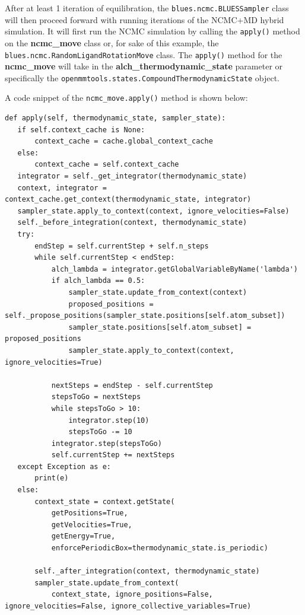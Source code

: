 After at least 1 iteration of equilibration, the \texttt{blues.ncmc.BLUESSampler} class will then proceed forward with running iterations of the NCMC+MD hybrid simulation.
It will first run the NCMC simulation by calling the \texttt{apply()} method on the \textbf{ncmc\_move} class or, for sake of this example, the \texttt{blues.ncmc.RandomLigandRotationMove} class.
The \texttt{apply()} method for the \textbf{ncmc\_move} will take in the \textbf{alch\_thermodynamic\_state} parameter or specifically the \texttt{openmmtools.states.CompoundThermodynamicState} object.

A code snippet of the \texttt{ncmc_move.apply()} method is shown below:

\begin{verbatim}
def apply(self, thermodynamic_state, sampler_state):
   if self.context_cache is None:
       context_cache = cache.global_context_cache
   else:
       context_cache = self.context_cache
   integrator = self._get_integrator(thermodynamic_state)
   context, integrator = context_cache.get_context(thermodynamic_state, integrator)
   sampler_state.apply_to_context(context, ignore_velocities=False)
   self._before_integration(context, thermodynamic_state)
   try:
       endStep = self.currentStep + self.n_steps
       while self.currentStep < endStep:
           alch_lambda = integrator.getGlobalVariableByName('lambda')
           if alch_lambda == 0.5:
               sampler_state.update_from_context(context)
               proposed_positions = self._propose_positions(sampler_state.positions[self.atom_subset])
               sampler_state.positions[self.atom_subset] = proposed_positions
               sampler_state.apply_to_context(context, ignore_velocities=True)

           nextSteps = endStep - self.currentStep
           stepsToGo = nextSteps
           while stepsToGo > 10:
               integrator.step(10)
               stepsToGo -= 10
           integrator.step(stepsToGo)
           self.currentStep += nextSteps
   except Exception as e:
       print(e)
   else:
       context_state = context.getState(
           getPositions=True,
           getVelocities=True,
           getEnergy=True,
           enforcePeriodicBox=thermodynamic_state.is_periodic)

       self._after_integration(context, thermodynamic_state)
       sampler_state.update_from_context(
           context_state, ignore_positions=False, ignore_velocities=False, ignore_collective_variables=True)
\end{verbatim}

